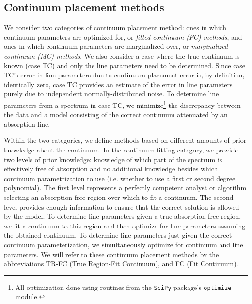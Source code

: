 \documentclass[manuscript]{aastex62}
\begin{document}
{ \bf
\subsection{Continuum placement methods}
\label{sec:artificial-tests:continuum-placement-methods}
We consider two categories of continuum placement method: ones in which continuum parameters are optimized for, or \emph{fitted continuum (FC) methods}, and ones in which continuum parameters are marginalized over, or \emph{marginalized continuum (MC) methods}.
We also consider a case where the true continuum is known (case TC) and only the line parameters need to be determined.
Since case TC's error in line parameters due to continuum placement error is, by definition, identically zero, case TC provides an estimate of the error in line parameters purely due to independent normally-distributed noise.
To determine line parameters from a spectrum in case TC, we minimize\footnote{All optimization done using routines from the \texttt{SciPy} package's \texttt{optimize} module.} the discrepancy between the data and a model consisting of the correct continuum attenuated by an absorption line.

Within the two categories, we define methods based on different amounts of prior knowledge about the continuum.
In the continuum fitting category, we provide two levels of prior knowledge: knowledge of which part of the spectrum is effectively free of absorption and no additional knowledge besides which continuum parametrization to use (i.e. whether to use a first or second degree polynomial).
The first level represents a perfectly competent analyst or algorithm selecting an absorption-free region over which to fit a continuum.
The second level provides enough information to ensure that the correct solution is allowed by the model.
To determine line parameters given a true absorption-free region, we fit a continuum to this region and then optimize for line parameters assuming the obtained continuum.
To determine line parameters just given the correct continuum parameterization, we simultaneously optimize for continuum and line parameters.
We will refer to these continuum placement methods by the abbreviations TR-FC (True Region-Fit Continuum), and FC (Fit Continuum).

}
\end{document}
